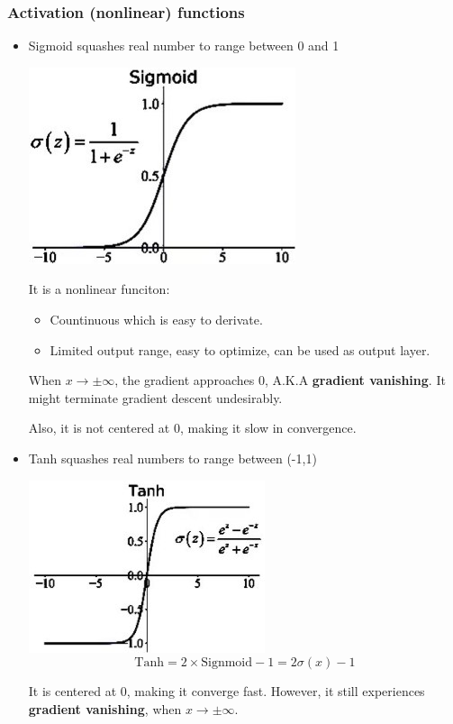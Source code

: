 \documentclass[letterpaper,12pt]{article}
\begin{document}
\subsubsection{Activation (non\-linear) functions}
\begin{itemize}
    \item Sigmoid squashes real number to range between 0 and 1
    
    \includegraphics*{./Image/Sigmoid function.jpg}

    It is a non\-linear funciton:
    \begin{itemize}
        \item Countinuous which is easy to derivate. 
        \item Limited output range, easy to optimize, can be used as output layer.
    \end{itemize}

    When $x\to \pm \infty$, the gradient approaches 0, A.K.A \textbf{gradient vanishing}. It might terminate gradient descent undesirably. 

    Also, it is not centered at 0, making it slow in convergence.
    \item Tanh squashes real numbers to range between (-1,1)
    
    \includegraphics*{./Image/Tanh funciton.jpg}
    \[\text{Tanh}=2\times \text{Signmoid}-1=2\sigma(x)-1\]

    It is centered at 0, making it converge fast. However, it still experiences \textbf{gradient vanishing}, when $x\to \pm \infty$. 


\end{itemize}
\end{document}
